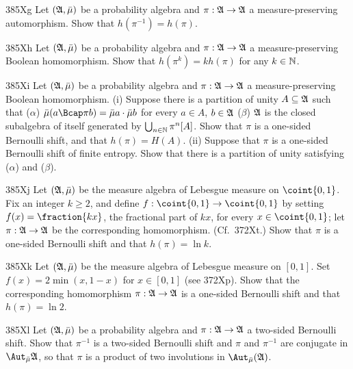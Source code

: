 {\sqheader 385Xg %
Let $(\frak A,\bar\mu)$ be a probability algebra and
$\pi:\frak A\to\frak A$ a measure-preserving automorphism.   Show that
$h(\pi^{-1})=h(\pi)$.
     
\spheader 385Xh %
Let $(\frak A,\bar\mu)$ be a probability algebra and
$\pi:\frak A\to\frak A$ a measure-preserving Boolean homomorphism.
Show that $h(\pi^k)=k h(\pi)$ for any $k\in\Bbb N$.   
     
\sqheader 385Xi %
Let $(\frak A,\bar\mu)$ be a probability algebra and
$\pi:\frak A\to\frak A$ a
measure-preserving Boolean homomorphism.   (i) Suppose there is a
partition of unity $A\subseteq\frak A$ such that ($\alpha$)
$\bar\mu(a\Bcap\pi b)=\bar\mu a\cdot\bar\mu b$ for every $a\in A$,
$b\in\frak A$ ($\beta$) $\frak A$ is the closed subalgebra of itself
generated by $\bigcup_{n\in\Bbb N}\pi^n[A]$.   Show that $\pi$ is a
one-sided Bernoulli shift, and that $h(\pi)=H(A)$.   (ii) Suppose that
$\pi$ is a one-sided Bernoulli shift of finite entropy.   Show that
there is a partition of unity satisfying ($\alpha$) and ($\beta$).
     
\sqheader 385Xj %
Let $(\frak A,\bar\mu)$ be the measure algebra of
Lebesgue measure on $\coint{0,1}$.   Fix an integer $k\ge 2$, and define
$f:\coint{0,1}\to\coint{0,1}$ by setting $f(x)=\fraction{kx}$, the
fractional part of $kx$, for every $x\in\coint{0,1}$;  let
$\pi:\frak A\to\frak A$ be the corresponding homomorphism.
(Cf.\ 372Xt.)   Show
that $\pi$ is a one-sided Bernoulli shift and that $h(\pi)=\ln k$.
     
\sqheader 385Xk %
Let $(\frak A,\bar\mu)$ be the measure algebra of
Lebesgue measure on $[0,1]$.   Set $f(x)=2\min(x,1-x)$ for $x\in[0,1]$
(see 372Xp).   Show that the corresponding homomorphism
$\pi:\frak A\to\frak A$ is a one-sided Bernoulli shift and that
$h(\pi)=\ln 2$.
     
\spheader 385Xl %
Let $(\frak A,\bar\mu)$ be a probability algebra and
$\pi:\frak A\to\frak A$ a two-sided Bernoulli shift.   Show that
$\pi^{-1}$ is a two-sided Bernoulli shift and $\pi$ and $\pi^{-1}$ are conjugate in $\AmuA$, so that $\pi$ is a product of two
involutions in $\Aut_{\bar\mu}(\frak A)$.
     
}
